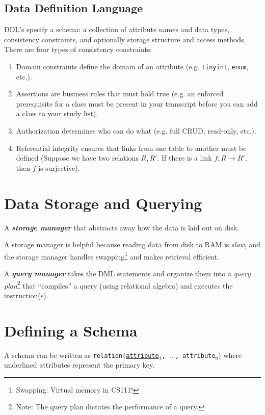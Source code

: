 \documentclass{report}
\newenvironment{definition}[1]{\begin{tcolorbox}[title={Definition: #1}]}{\end{tcolorbox}}
\renewcommand{\tt}[1]{\texttt{{#1}}}
\renewcommand{\it}[1]{\textit{{#1}}}
\newcommand{\ib}[1]{\textit{\textbf{{#1}}}}
\begin{document}
\subsection{Data Definition Language}
DDL's specify a schema: a collection of attribute names and data types, consistency constraints, and
optionally storage structure and access methods. There are four types of consistency constraints:
\begin{enumerate}[label=$\to$]
    \item Domain constraints define the domain of an attribute (e.g. \tt{tinyint}, \tt{enum}, etc.).
    \item Assertions are business rules that must hold true (e.g. an enforced prerequisite for a 
        class must be present in your transcript before you can add a class to your study list).
    \item Authorization determines who can do what (e.g. full CRUD, read-only, etc.).
    \item Referential integrity ensures that links from one table to another must be defined (Suppose
        we have two relations $R, R'$. If there is a link $f : R \to R'$, then $f$ is surjective).
\end{enumerate}


\section{Data Storage and Querying}
\begin{definition}{Storage Manager}
    A \ib{storage manager} that abstracts away how the data is laid out on disk.
\end{definition}
A storage manager is helpful because reading data from disk to RAM is \it{slow}, and the storage
manager handles swapping\footnote{Swapping: Virtual memory in CS111!} and makes retrieval efficient.

\begin{definition}{Query Manager}
    A \ib{query manager} takes the DML statements and organize them into a 
    \it{query plan}\footnote{Note: The query plan dictates the performance of a query.} that 
    ``compiles'' a query (using relational algebra) and executes the instruction(s).
\end{definition}


\section{Defining a Schema}
A schema can be written as \tt{relation(\underline{attribute$_{\tt{1}}$}, \tt{$\ldots$}, 
attribute$_{\tt{n}}$}) where underlined attributes represent the primary key.
\end{document}
